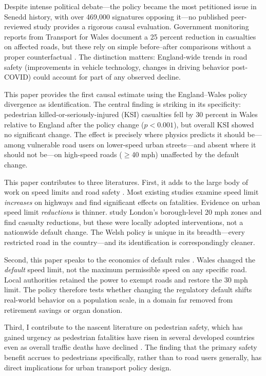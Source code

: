 \documentclass[12pt]{article}
\begin{document}
Despite intense political debate---the policy became the most petitioned issue in Senedd history, with over 469,000 signatures opposing it---no published peer-reviewed study provides a rigorous causal evaluation. Government monitoring reports from Transport for Wales document a 25 percent reduction in casualties on affected roads, but these rely on simple before--after comparisons without a proper counterfactual \citep{TfW2024}. The distinction matters: England-wide trends in road safety (improvements in vehicle technology, changes in driving behavior post-COVID) could account for part of any observed decline.

This paper provides the first causal estimate using the England--Wales policy divergence as identification. The central finding is striking in its specificity: pedestrian killed-or-seriously-injured (KSI) casualties fell by 30 percent in Wales relative to England after the policy change ($p < 0.001$), but overall KSI showed no significant change. The effect is precisely where physics predicts it should be---among vulnerable road users on lower-speed urban streets---and absent where it should not be---on high-speed roads ($\geq$40 mph) unaffected by the default change.

This paper contributes to three literatures. First, it adds to the large body of work on speed limits and road safety \citep{Dee2009, Greenstone2002, Ashenfelter2004}. Most existing studies examine speed limit \emph{increases} on highways and find significant effects on fatalities. Evidence on urban speed limit \emph{reductions} is thinner. \citet{Li2012} study London's borough-level 20 mph zones and find casualty reductions, but these were locally adopted interventions, not a nationwide default change. The Welsh policy is unique in its breadth---every restricted road in the country---and its identification is correspondingly cleaner.

Second, this paper speaks to the economics of default rules \citep{Madrian2001, Johnson2003}. Wales changed the \emph{default} speed limit, not the maximum permissible speed on any specific road. Local authorities retained the power to exempt roads and restore the 30 mph limit. The policy therefore tests whether changing the regulatory default shifts real-world behavior on a population scale, in a domain far removed from retirement savings or organ donation.

Third, I contribute to the nascent literature on pedestrian safety, which has gained urgency as pedestrian fatalities have risen in several developed countries even as overall traffic deaths have declined \citep{Governors2023}. The finding that the primary safety benefit accrues to pedestrians specifically, rather than to road users generally, has direct implications for urban transport policy design.
\end{document}
